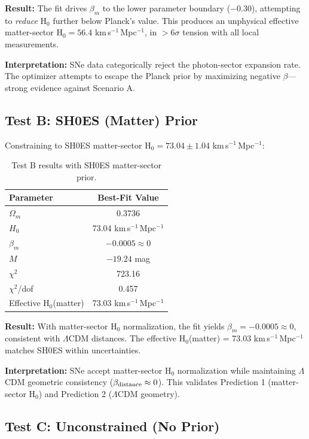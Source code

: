 \documentclass[twocolumn,superscriptaddress,prd,amsmath,amssymb]{revtex4-2}
\begin{document}
\textbf{Result:} The fit drives $\beta_m$ to the lower parameter boundary ($-0.30$), attempting to \textit{reduce} H$_0$ further below Planck's value. This produces an unphysical effective matter-sector H$_0 = 56.4$ km\,s$^{-1}$\,Mpc$^{-1}$, in $>6\sigma$ tension with all local measurements.

\textbf{Interpretation:} SNe data categorically reject the photon-sector expansion rate. The optimizer attempts to escape the Planck prior by maximizing negative $\beta$—strong evidence against Scenario A.

\subsection{Test B: SH0ES (Matter) Prior}

Constraining to SH0ES matter-sector H$_0 = 73.04 \pm 1.04$ km\,s$^{-1}$\,Mpc$^{-1}$:

\begin{table}[h]
\centering
\begin{tabular}{lc}
\hline\hline
Parameter & Best-Fit Value \\
\hline
$\Omega_m$ & 0.3736 \\
$H_0$ & 73.04 km\,s$^{-1}$\,Mpc$^{-1}$ \\
$\beta_m$ & $-0.0005 \approx 0$ \\
$M$ & $-19.24$ mag \\
\hline
$\chi^2$ & 723.16 \\
$\chi^2$/dof & 0.457 \\
\hline
Effective H$_0$(matter) & 73.03 km\,s$^{-1}$\,Mpc$^{-1}$ \\
\hline\hline
\end{tabular}
\caption{Test B results with SH0ES matter-sector prior.}
\label{tab:test_b}
\end{table}

\textbf{Result:} With matter-sector H$_0$ normalization, the fit yields $\beta_m = -0.0005 \approx 0$, consistent with $\Lambda$CDM distances. The effective H$_0$(matter) = 73.03 km\,s$^{-1}$\,Mpc$^{-1}$ matches SH0ES within uncertainties.

\textbf{Interpretation:} SNe accept matter-sector H$_0$ normalization while maintaining $\Lambda$CDM geometric consistency ($\beta_{\rm distance} \approx 0$). This validates Prediction 1 (matter-sector H$_0$) and Prediction 2 ($\Lambda$CDM geometry).

\subsection{Test C: Unconstrained (No Prior)}
\end{document}
